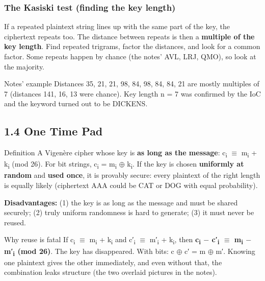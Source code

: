\documentclass[11pt,a4paper]{article}
\begin{document}
\subsubsection*{The Kasiski test (finding the key length)}
If a repeated plaintext string lines up with the same part of the key, the ciphertext repeats too. The distance between repeats is then a \textbf{multiple of the key length}. Find repeated trigrams, factor the distances, and look for a common factor. Some repeats happen by chance (the notes' AVL, LRJ, QMO), so look at the majority.\par
\begin{example}{Notes' example}
Distances 35, 21, 21, 98, 84, 98, 84, 84, 21 are mostly multiples of 7 (distances 141, 16, 13 were chance). Key length n = 7 was confirmed by the IoC and the keyword turned out to be DICKENS.\par
\end{example}
\subsection*{1.4 One Time Pad}
\begin{concept}{Definition}
A Vigenère cipher whose key is \textbf{as long as the message}: c\textsubscript{i} \ensuremath{\equiv} m\textsubscript{i} + k\textsubscript{i} (mod 26). For bit strings, c\textsubscript{i} = m\textsubscript{i} \ensuremath{\oplus} k\textsubscript{i}. If the key is chosen \textbf{uniformly at random} and \textbf{used once}, it is provably secure: every plaintext of the right length is equally likely (ciphertext AAA could be CAT or DOG with equal probability).\par
\end{concept}
\textbf{Disadvantages:} (1) the key is as long as the message and must be shared securely; (2) truly uniform randomness is hard to generate; (3) it must never be reused.\par
\begin{trap}{Why reuse is fatal}
If c\textsubscript{i} \ensuremath{\equiv} m\textsubscript{i} + k\textsubscript{i} and c′\textsubscript{i} \ensuremath{\equiv} m′\textsubscript{i} + k\textsubscript{i}, then \textbf{c\textsubscript{i} \ensuremath{-} c′\textsubscript{i} \ensuremath{\equiv} m\textsubscript{i} \ensuremath{-} m′\textsubscript{i} (mod 26)}. The key has disappeared. With bits: c \ensuremath{\oplus} c′ = m \ensuremath{\oplus} m′. Knowing one plaintext gives the other immediately, and even without that, the combination leaks structure (the two overlaid pictures in the notes).\par
\end{trap}
\end{document}
